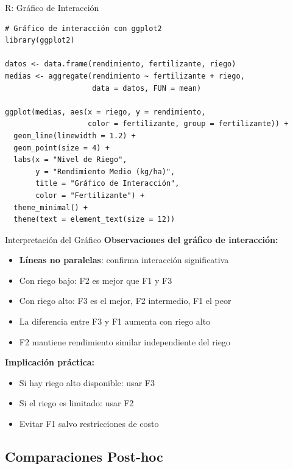 \documentclass[aspectratio=169]{beamer}
\begin{document}
\begin{frame}[fragile]{R: Gráfico de Interacción}
\small
\begin{verbatim}
# Gráfico de interacción con ggplot2
library(ggplot2)

datos <- data.frame(rendimiento, fertilizante, riego)
medias <- aggregate(rendimiento ~ fertilizante + riego,
                    data = datos, FUN = mean)

ggplot(medias, aes(x = riego, y = rendimiento,
                   color = fertilizante, group = fertilizante)) +
  geom_line(linewidth = 1.2) +
  geom_point(size = 4) +
  labs(x = "Nivel de Riego",
       y = "Rendimiento Medio (kg/ha)",
       title = "Gráfico de Interacción",
       color = "Fertilizante") +
  theme_minimal() +
  theme(text = element_text(size = 12))
\end{verbatim}
\end{frame}

\begin{frame}{Interpretación del Gráfico}
\textbf{Observaciones del gráfico de interacción:}

\begin{itemize}
\item \textbf{Líneas no paralelas}: confirma interacción significativa
\item Con riego bajo: F2 es mejor que F1 y F3
\item Con riego alto: F3 es el mejor, F2 intermedio, F1 el peor
\item La diferencia entre F3 y F1 aumenta con riego alto
\item F2 mantiene rendimiento similar independiente del riego
\end{itemize}

\vspace{0.3cm}

\textbf{Implicación práctica:}
\begin{itemize}
\item Si hay riego alto disponible: usar F3
\item Si el riego es limitado: usar F2
\item Evitar F1 salvo restricciones de costo
\end{itemize}
\end{frame}

\subsection{Comparaciones Post-hoc}
\end{document}
